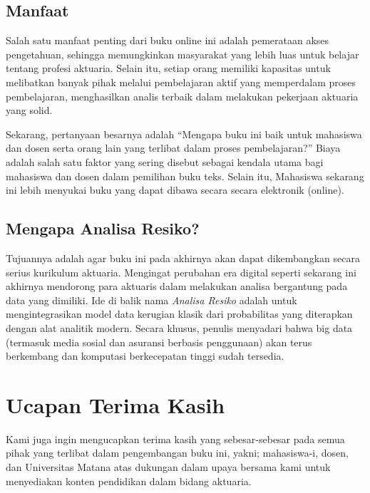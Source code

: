 \documentclass[
]{book}
\begin{document}
\hypertarget{manfaat}{%
\subsection*{Manfaat}\label{manfaat}}

Salah satu manfaat penting dari buku online ini adalah pemerataan akses pengetahuan, sehingga memungkinkan masyarakat yang lebih luas untuk belajar tentang profesi aktuaria. Selain itu, setiap orang memiliki kapasitas untuk melibatkan banyak pihak melalui pembelajaran aktif yang memperdalam proses pembelajaran, menghasilkan analis terbaik dalam melakukan pekerjaan aktuaria yang solid.

Sekarang, pertanyaan besarnya adalah ``Mengapa buku ini baik untuk mahasiswa dan dosen serta orang lain yang terlibat dalam proses pembelajaran?'' Biaya adalah salah satu faktor yang sering disebut sebagai kendala utama bagi mahasiswa dan dosen dalam pemilihan buku teks. Selain itu, Mahasiswa sekarang ini lebih menyukai buku yang dapat dibawa secara secara elektronik (online).

\hypertarget{mengapa-analisa-resiko}{%
\subsection*{Mengapa Analisa Resiko?}\label{mengapa-analisa-resiko}}

Tujuannya adalah agar buku ini pada akhirnya akan dapat dikembangkan secara serius kurikulum aktuaria. Mengingat perubahan era digital seperti sekarang ini akhirnya mendorong para aktuaris dalam melakukan analisa bergantung pada data yang dimiliki. Ide di balik nama \emph{Analisa Resiko} adalah untuk mengintegrasikan model data kerugian klasik dari probabilitas yang diterapkan dengan alat analitik modern. Secara khusus, penulis menyadari bahwa big data (termasuk media sosial dan asuransi berbasis penggunaan) akan terus berkembang dan komputasi berkecepatan tinggi sudah tersedia.

\hypertarget{ucapan-terima-kasih}{%
\section*{Ucapan Terima Kasih}\label{ucapan-terima-kasih}}

Kami juga ingin mengucapkan terima kasih yang sebesar-sebesar pada semua pihak yang terlibat dalam pengembangan buku ini, yakni; mahasiswa-i, dosen, dan Universitas Matana atas dukungan dalam upaya bersama kami untuk menyediakan konten pendidikan dalam bidang aktuaria.
\end{document}
